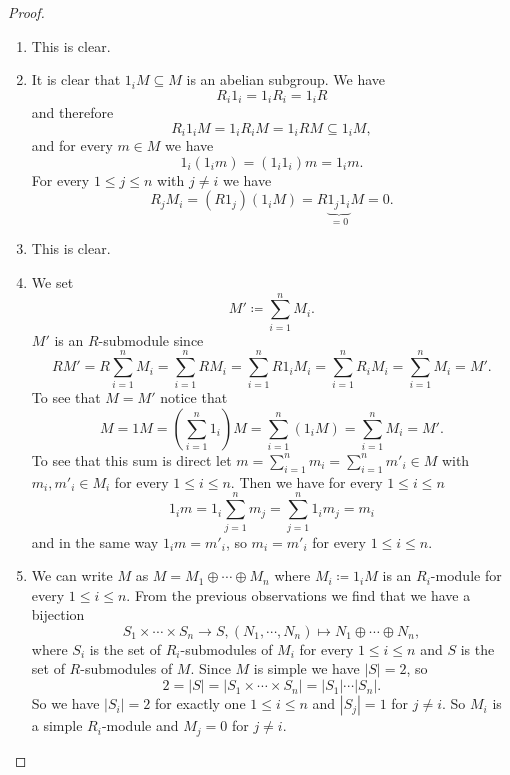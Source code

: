 \begin{proof}
  \begin{enumerate}[label=\emph{\alph*)},leftmargin=*]
    \item
      This is clear.
    \item
      It is clear that $1_i M \subseteq M$ is an abelian subgroup. We have
      \[
          R_i 1_i
        = 1_i R_i
        = 1_i R
      \]
      and therefore
      \[
                  R_i 1_i M
        =         1_i R_i M
        =         1_i R M
        \subseteq 1_i M,
      \]
      and for every $m \in M$ we have
      \[
          1_i (1_i m)
        = (1_i 1_i) m
        = 1_i m.
      \]
      For every $1 \leq j \leq n$ with $j \neq i$ we have
      \[
          R_j M_i
        = (R 1_j) (1_i M)
        = R \underbrace{1_j 1_i}_{=0} M
        = 0.
      \]
    \item
      This is clear.
    \item
      We set
      \[
        M' \coloneqq \sum_{i=1}^n M_i.
      \]
      $M'$ is an $R$-submodule since
      \[
          R M'
        = R \sum_{i=1}^n M_i
        = \sum_{i=1}^n R M_i
        = \sum_{i=1}^n R 1_i M_i
        = \sum_{i=1}^n R_i M_i
        = \sum_{i=1}^n M_i
        = M'.
      \]
      To see that $M = M'$ notice that
      \[
          M
        = 1 M
        = \left( \sum_{i=1}^n 1_i \right) M
        = \sum_{i=1}^n (1_i M)
        = \sum_{i=1}^n M_i
        = M'.
      \]
      To see that this sum is direct let $m = \sum_{i=1}^n m_i = \sum_{i=1}^n m'_i \in M$ with $m_i, m'_i \in M_i$ for every $1 \leq i \leq n$.
      Then we have for every $1 \leq i \leq n$
      \[
          1_i m
        = 1_i \sum_{j=1}^n m_j
        = \sum_{j=1}^n 1_i m_j
        = m_i
      \]
      and in the same way $1_i m = m'_i$, so $m_i = m'_i$ for every $1 \leq i \leq n$.
    \item
      We can write $M$ as $M = M_1 \oplus \dotsb \oplus M_n$ where $M_i \coloneqq 1_i M$ is an $R_i$-module for every $1 \leq i \leq n$.
      From the previous observations we find that we have a bijection
      \[
                S_1 \times \dotsb \times S_n
        \to     S,
                (N_1, \dotsb, N_n)
        \mapsto N_1 \oplus \dotsb \oplus N_n,
      \]
      where $S_i$ is the set of $R_i$-submodules of $M_i$ for every $1 \leq i \leq n$ and $S$ is the set of $R$-submodules of $M$.
      Since $M$ is simple we have $|S| = 2$, so
      \[
          2
        = |S|
        = |S_1 \times \dotsb \times S_n|
        = |S_1| \dotsm |S_n|.
      \]
      So we have $|S_i| = 2$ for exactly one $1 \leq i \leq n$ and $|S_j| = 1$ for $j \neq i$.
      So $M_i$ is a simple $R_i$-module and $M_j = 0$ for $j \neq i$.
    \qedhere
  \end{enumerate}
\end{proof}


